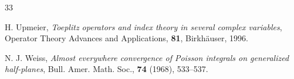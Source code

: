 \documentclass[12pt,reqno]{amsart}
\theoremstyle{remark}
\theoremstyle{definition}
\begin{document}
\begin{thebibliography}{33}













H. Upmeier, \emph{Toeplitz operators and index theory in several complex variables}, Operator Theory Advances and Applications,  {\bf 81}, Birkh\"auser, 1996.



N. J. Weiss, \emph{Almost everywhere convergence of Poisson integrals on generalized half-planes}, Bull. Amer. Math. Soc.,   {\bf 74} (1968), 533–537.











\end{thebibliography}
\end{document}

